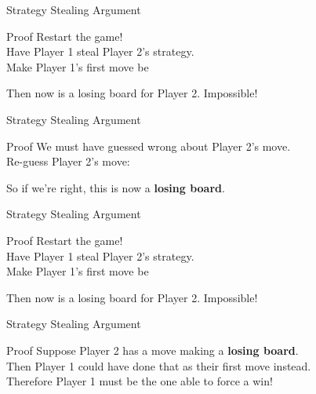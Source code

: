 \documentclass{beamer}
\begin{document}
\begin{frame}{Strategy Stealing Argument}
  \begin{block}{Proof}
    Restart the game!\\
\pause
    Have {\color{blue}Player 1} steal {\color{red}Player 2}'s strategy.\\
\pause
    Make {\color{blue}Player 1}'s first move be
    \begin{center}
    \end{center}
\pause
    Then now is a losing board for {\color{red}Player 2}.  Impossible!
  \end{block}
\end{frame}

\begin{frame}{Strategy Stealing Argument}
  \begin{block}{Proof}
    We must have guessed wrong about {\color{red}Player 2}'s move.\\
\pause
    Re-guess {\color{red}Player 2}'s move:
    \begin{center}
    \end{center}
\pause
    So if we're right, this is now a \textbf{losing board}.
  \end{block}
\end{frame}

\begin{frame}{Strategy Stealing Argument}
  \begin{block}{Proof}
    Restart the game!\\
\pause
    Have {\color{blue}Player 1} steal {\color{red}Player 2}'s strategy.\\
\pause
    Make {\color{blue}Player 1}'s first move be
    \begin{center}
    \end{center}
\pause
    Then now is a losing board for {\color{red}Player 2}.  Impossible!
  \end{block}
\end{frame}

\begin{frame}{Strategy Stealing Argument}
  \begin{block}{Proof}
\pause
    Suppose {\color{red}Player 2} has a move making a \textbf{losing board}.\\
\pause
    Then {\color{blue}Player 1} could have done that as their first move instead.\\
\pause
    Therefore {\color{blue}Player 1} must be the one able to force a win!
  \end{block}
\end{frame}
\end{document}
